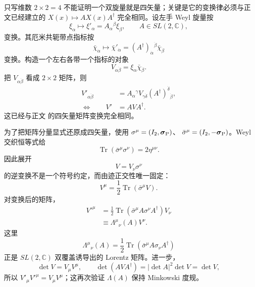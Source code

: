 \begin{derivation}
只写维数 $2\times2=4$ 不能证明一个双旋量就是四矢量；关键是它的变换律必须与正文已经建立的
$X(x)\mapsto AX(x)A^\dagger$ 完全相同。设左手 Weyl 旋量按
\begin{equation*}
 \xi_\alpha\longmapsto \xi'_\alpha
 =A_\alpha{}^\beta\xi_\beta,
 \qquad A\in SL(2,\mathbb C),
\end{equation*}
变换。其厄米共轭带点指标按
\begin{equation*}
 \bar\chi_{\dot\alpha}\longmapsto
 \bar\chi'_{\dot\alpha}
 =(A^\dagger)_{\dot\alpha}{}^{\dot\beta}
 \bar\chi_{\dot\beta}
\end{equation*}
变换。构造一个左右各带一个指标的对象
\begin{equation*}
 V_{\alpha\dot\beta}=\xi_\alpha\bar\chi_{\dot\beta}.
\end{equation*}
把 $V_{\alpha\dot\beta}$ 看成 $2\times2$ 矩阵，则
\begin{align*}
 V'_{\alpha\dot\beta}
 &=A_\alpha{}^\gamma
 V_{\gamma\dot\delta}
 (A^\dagger)^{\dot\delta}{}_{\dot\beta},\\
 \Longleftrightarrow\qquad
 V'&=AVA^\dagger.
\end{align*}
这已经与正文 的四矢量矩阵变换完全相同。

为了把矩阵分量显式还原成四矢量，使用
$\sigma^\mu=(I_2,\boldsymbol\sigma_{\rm P})$、
$\bar\sigma^\mu=(I_2,-\boldsymbol\sigma_{\rm P})$。Weyl 交织恒等式给
\begin{equation*}
 \operatorname{Tr}(\bar\sigma^\mu\sigma^\nu)=2\eta^{\mu\nu}.
\end{equation*}
因此展开
\begin{equation*}
 V=V_\nu\sigma^\nu
\end{equation*}
的逆变换不是一个符号约定，而由迹正交性唯一固定：
\begin{equation*}
 V^\mu=\frac12\operatorname{Tr}(\bar\sigma^\mu V).
\end{equation*}
对变换后的矩阵，
\begin{align*}
 V'^\mu
 &=\frac12\operatorname{Tr}(\bar\sigma^\mu A\sigma^\nu A^\dagger)V_\nu\\
 &\equiv\Lambda^\mu{}_{\nu}(A)V^\nu .
\end{align*}
这里
\begin{equation*}
 \Lambda^\mu{}_{\nu}(A)
 =\frac12\operatorname{Tr}
 \left(\bar\sigma^\mu A\sigma_\nu A^\dagger\right)
\end{equation*}
正是 $SL(2,\mathbb C)$ 双覆盖诱导出的 Lorentz 矩阵。进一步，
\begin{equation*}
 \det V=V_\mu V^\mu,
 \qquad
 \det(AVA^\dagger)=|\det A|^2\det V=\det V,
\end{equation*}
所以
$V'_\mu V'^\mu=V_\mu V^\mu$；这再次验证 $\Lambda(A)$ 保持 Minkowski 度规。


\end{derivation}
